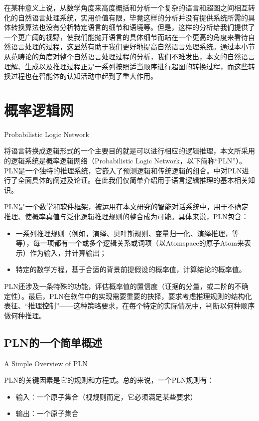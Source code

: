 在某种意义上说，从数学角度来高度概括和分析一个复杂的语言和超图之间相互转化的自然语言处理系统，实用价值有限，毕竟这样的分析并没有提供系统所需的具体转换算法也没有分析特定语言的细节和语境等。但是，这样的分析给我们提供了一个更广阔的视野，使我们能抛开语言的具体细节而站在一个更高的角度来看待自然语言处理的过程，这显然有助于我们更好地提高自然语言处理系统。通过本小节从范畴论的角度对整个自然语言处理过程的分析，我们不难发出，本文的自然语言理解、生成以及推理过程正是一系列按照适当顺序进行超图的转换过程，而这些转换过程也在智能体的认知活动中起到了重大作用。

\section{概率逻辑网}{Probabilistic Logic Network }
\label{sec:pln}

将语言转换成逻辑形式的一个主要目的就是可以进行相应的逻辑推理，本文所采用的逻辑系统是概率逻辑网络（Probabilistic Logic Network，以下简称“PLN”）。 PLN是一个独特的推理系统，它嵌入了预测逻辑和传统逻辑的组合。\cite{Goertzel2008, RWR}中对PLN进行了全面具体的阐述及论证。在此我们仅简单介绍用于语言逻辑推理的基本相关知识。

PLN是一个数学和软件框架，被运用在本文研究的智能对话系统中，用于不确定推理、使概率真值与泛化逻辑推理规则的整合成为可能。具体来说，PLN包含：

\begin{itemize}
\item 一系列推理规则（例如，演绎、贝叶斯规则、变量归一化、演绎推理，等等），每一项都有一个或多个逻辑关系或词项（以Atomspace的原子Atom来表示）作为输入，并计算输出；
\item 特定的数学方程，基于合适的背景前提假设的概率值，计算结论的概率值。
\end{itemize}
PLN还涉及一条特殊的功能，评估概率值的置信度（证据的分量，或二阶的不确定性）。最后，PLN在软件中的实现需要重要的抉择，要求考虑推理规则的结构化表征、“推理控制”——这种策略要求，在每个特定的实际情况中，判断以何种顺序做何种推理。

\subsection{PLN的一个简单概述}{A Simple Overview of PLN}

PLN的关键因素是它的规则和方程式。总的来说，一个PLN规则有：

\begin{itemize}
\item 输入：一个原子集合（视规则而定，它必须满足某些要求）
\item 输出：一个原子集合
\end{itemize}

